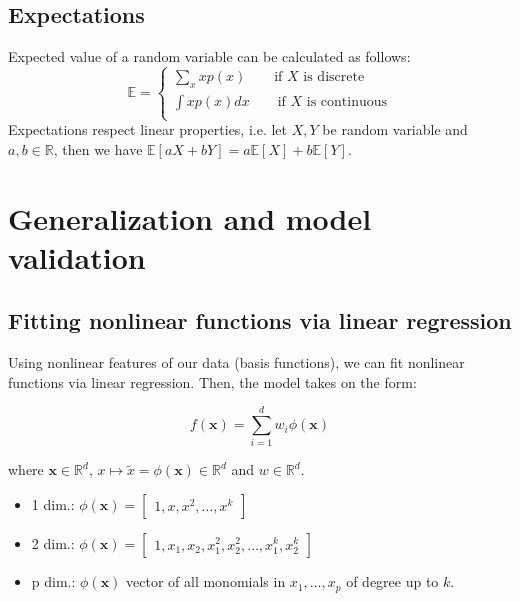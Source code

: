 \documentclass[a4paper,10pt,twoside]{article}
\begin{document}
\subsection{Expectations}
Expected value of a random variable can be calculated as follows:
\begin{equation*}
    \mathbb{E}=\begin{cases}
        \sum_{x}xp(x)\qquad\text{if }X\text{ is discrete}\\
        \int xp(x)dx\qquad\text{if }X\text{ is continuous}\\
    \end{cases}
\end{equation*}
Expectations respect linear properties, i.e. let $X, Y$ be random variable and
$a,b\in\mathbb{R}$, then we have $\mathbb{E}[aX+bY]=a\mathbb{E}[X]+b\mathbb{E}[Y]$.

\section{Generalization and model validation}

\subsection{Fitting nonlinear functions via linear regression}

Using nonlinear features of our data (basis functions), we can fit nonlinear functions via linear regression. Then, the model takes on the form:

\begin{equation}
    f(\mathbf{x}) = \sum_{i=1}^{d}w_i\phi(\mathbf{x})
\end{equation}

where $\mathbf{x}\in\mathbb{R}^d$, $x\mapsto \tilde{x}=\phi(\mathbf{x})\in\mathbb{R}^d$ and $w\in\mathbb{R}^d$.
\begin{itemize}
    \item 1 dim.: $\phi(\mathbf{x})=\begin{bmatrix}
        1,x, x^2, \ldots, x^k
    \end{bmatrix}$
    \item 2 dim.: $\phi(\mathbf{x})=\begin{bmatrix}
        1,x_1, x_2, x_1^2, x_2^2, \ldots, x_1^k, x_2^k
    \end{bmatrix}$
    \item p dim.: $\phi(\mathbf{x})$ vector of all monomials in $x_1,\ldots, x_p$ of degree up to $k$.
\end{itemize}
\end{document}
